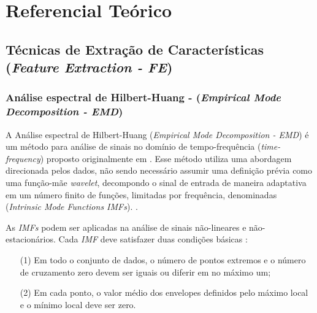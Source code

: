 \documentclass[10pt,journal,compsoc]{IEEEtran}
\begin{document}


\section{Referencial Teórico}\label{ref_teo}
\subsection{Técnicas de Extração de Características (\textit{Feature Extraction - FE})}
\subsubsection{Análise espectral de Hilbert-Huang - (\textit{Empirical Mode Decomposition - EMD})}

A Análise espectral de Hilbert-Huang (\textit{Empirical Mode Decomposition - EMD}) é um método para análise de sinais no domínio de tempo-frequência (\textit{time-frequency}) proposto originalmente em \cite{Huang1998}. Esse método utiliza uma abordagem direcionada pelos dados, não sendo necessário assumir uma definição prévia como uma função-mãe \textit{wavelet}, decompondo o sinal de entrada de maneira adaptativa em um número finito de funções, limitadas por frequência, denominadas (\textit{Intrinsic Mode Functions IMFs}). \cite{Li2013807} \cite{Trad2016}. 

As \textit{IMFs} podem ser aplicadas na análise de sinais não-lineares e não-estacionários. Cada \textit{IMF} deve satisfazer duas condições básicas \cite{Li2013807}:

\begin{itemize}[]
	\item[(1)] Em todo o conjunto de dados, o número de pontos extremos e o número de cruzamento zero devem ser iguais ou diferir em no máximo um;
	\item[(2)] Em cada ponto, o valor médio dos envelopes definidos pelo máximo local e o mínimo local deve ser zero.  \\

\end{itemize} 
\end{document}
